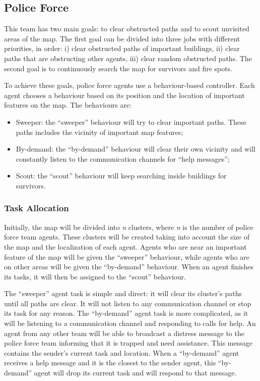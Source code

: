 \subsection{Police Force}
\label{sec:police}
This team has two main goals: to clear obstructed paths and to scout unvisited areas of the map. The first goal can be divided into three jobs with different priorities, in order: i) clear obstructed paths of important buildings, ii) clear paths that are obstructing other agents, iii) clear random obstructed paths. The second goal is to continuously search the map for survivors and fire spots.

To achieve these goals, police force agents use a behaviour-based controller. Each agent chooses a behaviour based on its position and the location of important features on the map. The behaviours are:

\begin{itemize}

\item Sweeper: the ``sweeper'' behaviour will try to clear important paths. These paths includes the vicinity of important map features;

\item By-demand: the ``by-demand'' behaviour will clear their own vicinity and will constantly listen to the communication channels for ``help messages'';

\item Scout: the ``scout'' behaviour will keep searching inside buildings for survivors.

\end{itemize}

\subsubsection{Task Allocation}
Initially, the map will be divided into \emph{n} clusters, where \emph{n} is the number of police force team agents. These clusters will be created taking into account the size of the map and the localization of each agent. Agents who are near an important feature of the map will be given the ``sweeper'' behaviour, while agents who are on other areas will be given the ``by-demand'' behaviour. When an agent finishes its tasks, it will then be assigned to the ``scout'' behaviour.

The ``sweeper'' agent task is simple and direct: it will clear its cluster's paths until all paths are clear. It will not listen to any communication channel or stop its task for any reason. The ``by-demand'' agent task is more complicated, as it will be listening to a communication channel and responding  to calls for help. An agent from any other team will be able to broadcast a distress message to the police force team informing that it is trapped and need assistance. This message contains the sender's current task and location. When a ``by-demand'' agent receives a help message and it is the closest to the sender agent, this ``by-demand'' agent will drop its current task and will respond to that message.

